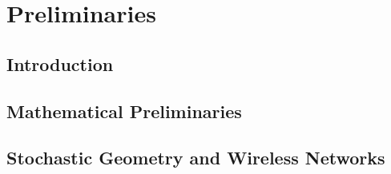 \renewcommand*{\cftchapterleader}{\hfill}
%
\tableofcontents*
\clearpage






\setlength{\abovedisplayskip}{6pt}
\setlength{\abovedisplayshortskip}{6pt}
\setlength{\belowdisplayskip}{6pt}
\setlength{\belowdisplayshortskip}{6pt}

\textual

\setcounter{page}{14}
\part{Preliminaries}

\chapter{Introduction}
\label{cap:P1_01} \thispagestyle{empty}
\def\printfig{1} %


\chapter{Mathematical Preliminaries}
\label{cap:P1_02} \thispagestyle{empty}
\def\printfig{1} %


\chapter{Stochastic Geometry and Wireless Networks}
\label{cap:P1_03} \thispagestyle{empty}
\def\printfig{1} %


